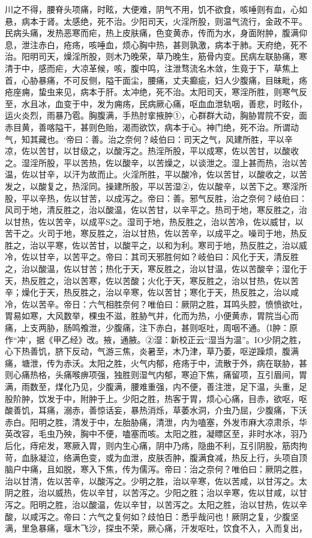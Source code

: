 \documentclass[a4paper,12pt,UTF8,twoside]{ctexbook}
\begin{document}
川之不得，腰脊头项痛，时眩，大便难，阴气不用，饥不欲食，咳唾则有血，心如悬，病本于肾。太感绝，死不治。少阳司天，火淫所股，则温气流行，金政不平。民病头痛，发热恶寒而疟，热上皮肤痛，色变黄赤，传而为水，身面附肿，腹满仰息，泄注赤白，疮疡，咳唾血，烦心胸中热，甚则孰激，病本于肺。天府绝，死不治。阳明司天，燥淫所股，则木乃晚荣，草乃晚生，筋骨内变。民病左联胁痛，寒清于中，感而疟，大凉革候，咳，腹中鸣，注泄骛流名木敛，生竟于下，草焦上首，心胁暴痛，不可反侧，隘干面尘，腰痛，丈夫癫疵，妇人少腹痛，目昧毗，疡疮座痈，蛰虫来见，病本于肝。太冲绝，死不治。太阳司天，寒淫所胜，则寒气反至，水且冰，血变于中，发为痈疡，民病厥心痛，呕血血泄轨咽，善悲，时眩仆，运火炎烈，雨暴乃雹。胸腹满，手热肘挛掖肿①，心群群大动，胸胁胃院不安，面赤目黄，善喀隘干，甚则色贻，渴而欲饮，病本于心。神门绝，死不治。所谓动气，知其藏也。‘帝曰：善。治之奈何？岐伯曰：司天之气，风建所胜，平以辛凉，佐以苦甘，以甘级之，以酸泻之。热淫所股，平以成寒，佐以苦甘，以酸收之。湿淫所股，平以苦热，佐以酸辛，以苦燥之，以谈泄之。湿上甚而热，治以苦温，佐以甘辛，以汗为故而止。火淫所胜，平以酸冷，佐以苦甘，以酸收之，以苦发之，以酸复之，热淫同。操建所股，平以苦湿②，佐以酸辛，以苦下之。寒淫所股，平以辛热，佐以甘苦，以成泻之。帝曰：善。邪气反胜，治之奈何？岐伯曰：风司于地，清反胜之，治以酸温，佐以苦甘，以辛平之。热司于地，寒反胜之，治以甘热，佐以苦辛，以成平S之。湿司于地，热反胜之，治以苦冷，佐以威甘，以苦干之。火司于地，寒反胜之，治以甘热，佐以苦辛，以成平之。噪司于地，热反胜之，治以平寒，佐以苦甘，以酸平之，以和为利。寒司于地，热反胜之，治以威冷，佐以甘辛，以苦平之。帝曰：其司天邪胜何如？岐伯曰：风化于天，清反胜之，治以酸温，佐以甘苦；热化于天，寒反胜之，治以甘温，佐以苦酸辛；湿化于天，热反胜之，治以苦寒，佐以苦酸；火化于天，寒反胜之，治以甘热，佐以苦辛；燥化于天，热反胜之，治以辛寒，佐以苦甘；寒化于天，热反胜之，治以咸冷，佐以苦辛。帝日：六气相胜奈何？唯伯曰：厥阴之胜，耳鸣头腔，愤愤欲吐，胃易如寒，大风数举，棵虫不滋，胜胁气并，化而为热，小便黄赤，胃院当心而痛，上支两胁，肠鸣飧泄，少腹痛，注下赤白，甚则呕吐，周咽不通。（I肿：原作“冲’，据《甲乙经》改。掖，通腋。②湿：新校正云“湿当为温”。IO少阴之胜，心下热善饥，脐下反动，气游三焦，炎暑至，木乃津，草乃萎，呕逆躁烦，腹满痛，塘泄，传为赤沃。太阳之胜，火气内郁，疮疡于中，流散于外，病在联胁，甚则心痛热格，头痛喉痹项强，独胜则湿气内郁，寒迫下焦，痛留项，互引眉间，胃满，雨数至，煤化乃见，少腹满，腰难重强，内不便，善注泄，足下温，头重，足股阶肿，饮发于中，附肿于上。少阳之胜，热客于胃，烦心心痛，目赤，欲呕，呕酸善饥，耳痛，溺赤，善惊话妄，暴热消烁，草萎水洞，介虫乃屈，少腹痛，下沃赤白。阳明之胜，清发于中，左胎胁痛，清泄，内为嗑塞，外发市麻大凉肃杀，华英改容，毛虫乃殃，胸中不便，嗑塞而咳。太阳之胜，凝瞟区至，非时水冰，羽乃后化，痔疟发，寒厥入胃，则内生心痛，阴中乃疡，隐曲不利，互引阴股，筋肉拘苛，血脉凝泣，络满色变，或为血泄，皮肤否肿，腹满食减，热反上行，头项自顶脑户中痛，且如脱，寒入下焦，传为儒泻。帝曰：治之奈何？唯伯曰：厥阴之胜，治以甘清，佐以苦辛，以酸泻之。少明之胜，治以辛寒，佐以苦咸，以甘泻之。太阴之胜，治以威热，佐以辛甘，以苦泻之。少阳之胜；治以辛寒，佐以甘咸，以甘泻之。阳明之胜，治以酸温，佐以辛甘，以苦泻之。太阳之胜，治以甘热，佐以辛酸，以咸泻之。帝曰：六气之复何如？歧怕日：悉乎哉问也！厥阴之复，少腹坚满，里急暴痛，堰木飞沙，探虫不荣，厥心痛，汗发呕吐，饮食不入，入而复出，
\end{document}
